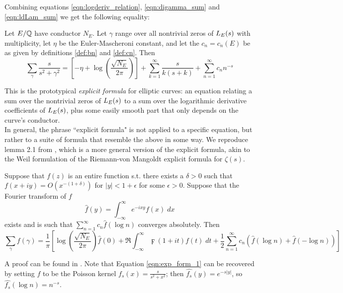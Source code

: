 Combining equations \ref{eqn:logderiv_relation}, \ref{eqn:digamma_sum} and \ref{eqn:ldLam_sum} we get the following equality:
\begin{proposition}
Let $E/\mathbb{Q}$ have conductor $N_E$. Let $\gamma$ range over all nontrivial zeros of $L_E(s)$ with multiplicity, let $\eta$ be the Euler-Mascheroni constant, and let the $c_n = c_n(E)$ be as given by definitions \ref{def:bn} and \ref{def:cn}. Then
\begin{equation}\label{eqn:exp_form_1}
\sum_{\gamma} \frac{s}{s^2 + \gamma^2} = \left[-\eta + \log\left(\frac{\sqrt{N_E}}{2\pi}\right)\right] + \sum_{k=1}^{\infty} \frac{s}{k(s+k)} + \sum_{n=1}^{\infty} c_n n^{-s}
\end{equation}
\end{proposition}
This is the prototypical {\it explicit formula} for elliptic curves: an equation relating a sum over the nontrivial zeros of $L_E(s)$ to a sum over the logarithmic derivative coefficients of $L_E(s)$, plus some easily smooth part that only depends on the curve's conductor. \\

In general, the phrase ``explicit formula" is not applied to a specific equation, but rather to a suite of formula that resemble the above in some way. We reproduce lemma 2.1 from \cite{Bob-2011}, which is a more general version of the explicit formula, akin to the Weil formulation of the Riemann-von Mangoldt explicit formula for $\zeta(s)$.
\begin{lemma}\label{lem:exp_form_2}
Suppose that $f(z)$ is an entire function s.t. there exists a $\delta>0$ such that $f(x+iy) = O(x^{-(1+\delta)})$ for $|y|<1+\epsilon$ for some $\epsilon>0$. Suppose that the Fourier transform of $f$
\begin{equation}
\hat{f}(y) = \int_{-\infty}^{\infty} e^{-i x y}f(x)\; dx
\end{equation}
exists and is such that $\sum_{n=1}^{\infty} c_n \hat{f}\left(\log n\right)$ converges absolutely. Then
\begin{equation}\label{eqn:exp_form_2}
\sum_{\gamma} f(\gamma) = \frac{1}{\pi}\left[\log\left(\frac{\sqrt{N_E}}{2\pi}\right)\hat{f}(0) + \Re\int_{-\infty}^{\infty} \digamma(1+it)f(t) \; dt  + \frac{1}{2} \sum_{n=1}^{\infty} c_n \left( \hat{f}\left(\log n\right) + \hat{f}\left(-\log n\right)\right) \right]
\end{equation}
\end{lemma}
A proof can be found in \cite[Theorem 5.12]{IwKo-2004}. Note that Equation \ref{eqn:exp_form_1} can be recovered by setting $f$ to be the Poisson kernel $f_s(x) = \frac{s}{s^2+x^2}$; then $\hat{f_s}(y) = e^{-s|y|}$, so $\hat{f_s}(\log n) = n^{-s}$. \\

